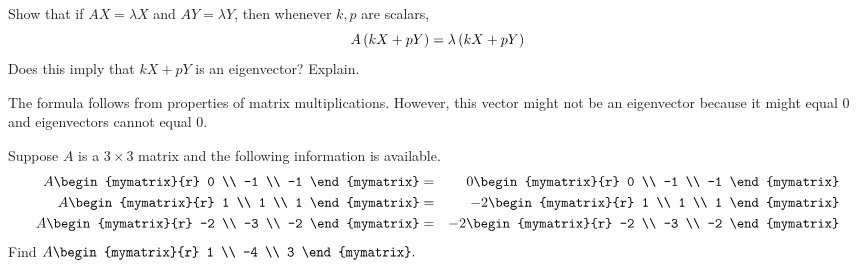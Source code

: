 \begin{enumialphparenastyle}
\begin{ex} Show that if $AX=\lambda X$ and $AY=\lambda Y$, then whenever $k,p$ are scalars,
\begin{equation*}
A\left(kX+pY\right) =\lambda \left(kX+pY\right) 
\end{equation*}
Does this imply that $kX+pY$ is an eigenvector? Explain.
\vspace{1mm} 
\begin{sol}
The formula follows from properties of matrix multiplications. However,
this vector might not be an eigenvector because it might equal $0$
and eigenvectors cannot equal $0$. 
\end{sol}
\end{ex}

\begin{ex} Suppose $A$ is a $3\times 3$ matrix and the following information is
available. 
\begin{eqnarray*}
A\begin{mymatrix}{r}
0 \\
-1 \\
-1
\end{mymatrix} &=&0\begin{mymatrix}{r}
0 \\
-1 \\
-1
\end{mymatrix} \\
A\begin{mymatrix}{r}
1 \\
1 \\
1
\end{mymatrix} &=&-2\begin{mymatrix}{r}
1 \\
1 \\
1
\end{mymatrix} \\
A\begin{mymatrix}{r}
-2 \\
-3 \\
-2
\end{mymatrix} &=&-2\begin{mymatrix}{r}
-2 \\
-3 \\
-2
\end{mymatrix}
\end{eqnarray*}
Find $A\begin{mymatrix}{r}
1 \\
-4 \\
3
\end{mymatrix}. $
\end{ex}


\end{enumialphparenastyle}
